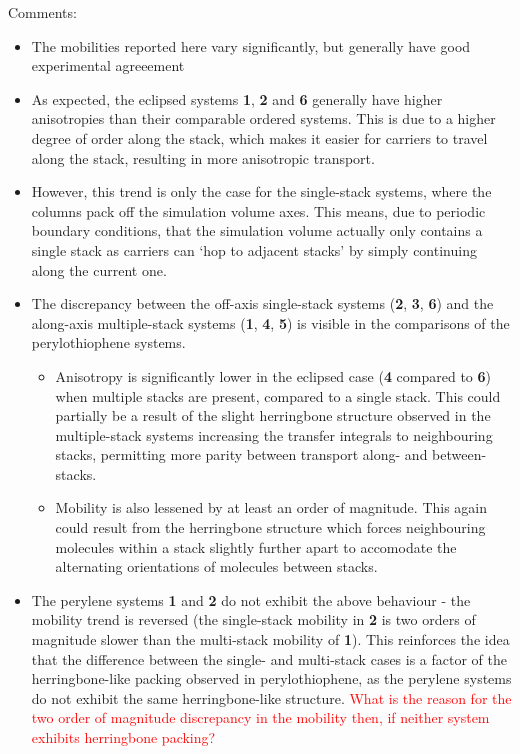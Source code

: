 \documentclass[12pt]{article}
\begin{document}
Comments:
\begin{itemize}
    \item{The mobilities reported here vary significantly, but generally have good experimental agreeement}
    \item{As expected, the eclipsed systems \textbf{1}, \textbf{2} and \textbf{6} generally have higher anisotropies than their comparable ordered systems.
        This is due to a higher degree of order along the stack, which makes it easier for carriers to travel along the stack, resulting in more anisotropic transport.}
    \item{However, this trend is only the case for the single-stack systems, where the columns pack off the simulation volume axes.
        This means, due to periodic boundary conditions, that the simulation volume actually only contains a single stack as carriers can `hop to adjacent stacks' by simply continuing along the current one.}
    \item{The discrepancy between the off-axis single-stack systems (\textbf{2}, \textbf{3}, \textbf{6}) and the along-axis multiple-stack systems (\textbf{1}, \textbf{4}, \textbf{5}) is visible in the comparisons of the perylothiophene systems.
            \begin{itemize}
                \item{Anisotropy is significantly lower in the eclipsed case (\textbf{4} compared to \textbf{6}) when multiple stacks are present, compared to a single stack.
                    This could partially be a result of the slight herringbone structure observed in the multiple-stack systems increasing the transfer integrals to neighbouring stacks, permitting more parity between transport along- and between-stacks.}
                \item{Mobility is also lessened by at least an order of magnitude.
                    This again could result from the herringbone structure which forces neighbouring molecules within a stack slightly further apart to accomodate the alternating orientations of molecules between stacks.}
            \end{itemize}
        }
    \item{The perylene systems \textbf{1} and \textbf{2} do not exhibit the above behaviour - the mobility trend is reversed (the single-stack mobility in \textbf{2} is two orders of magnitude slower than the multi-stack mobility of \textbf{1}).
            This reinforces the idea that the difference between the single- and multi-stack cases is a factor of the herringbone-like packing observed in perylothiophene, as the perylene systems do not exhibit the same herringbone-like structure.
        \textcolor{red}{What is the reason for the two order of magnitude discrepancy in the mobility then, if neither system exhibits herringbone packing?}}
\end{itemize}
\end{document}
